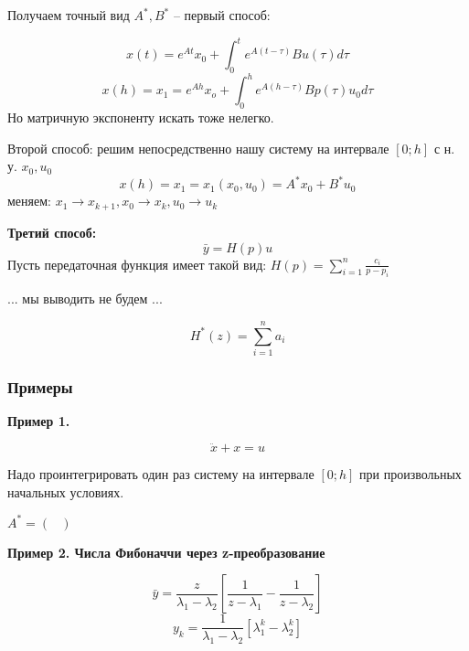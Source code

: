 \documentclass[main.tex]{subfiles}
\begin{document}
Получаем точный вид $ A^*, B^* $ -- первый способ:

\[ x(t) = e^{At} x_0 + \int_{0}^{t} e^{A(t-\tau)} B u(\tau) d \tau \]
\[ x(h) = x_1 = e^{Ah} x_o + \int_{0}^{h} e^{A(h-\tau)} B p(\tau) u_0 d \tau \]
Но матричную экспоненту искать тоже нелегко.

Второй способ: решим непосредственно нашу систему на интервале $ [0;h] $ с н. у. $ x_0, u_0 $
\[ x(h) = x_1 = x_1(x_0, u_0) = A^* x_0 + B^* u_0 \]
меняем: $ x_1 \to x_{k+1}, x_0 \to x_k, u_0 \to u_k $

\textbf{ Третий способ: }
\[ \bar y = H(p) u \]
Пусть передаточная функция имеет такой вид: $ H(p) = \sum_{i=1}^{n} \frac{c_i}{p-p_i} $

... мы выводить не будем ...

\[ H^*(z) = \sum_{i=1}^{n} a_i  \] %

\subsubsection{ Примеры }

\textbf{ Пример 1. }

\[ \ddot x + x = u \]

Надо проинтегрировать один раз систему на интервале $ [0;h] $ при произвольных начальных условиях.


$ A^* = \begin{pmatrix}
 \\
\end{pmatrix} $

\textbf{ Пример 2. Числа Фибоначчи через z-преобразование }

\[ \bar y = \frac{z}{\lambda_1 - \lambda_2} \left[ \frac{1}{z - \lambda_1} - \frac{ 1 }{z - \lambda_2} \right]  \]
\[ \boxed{ y_k = \frac{1}{\lambda_1 - \lambda_2} [ \lambda_1^k - \lambda_2^k ] } \]
\end{document}
